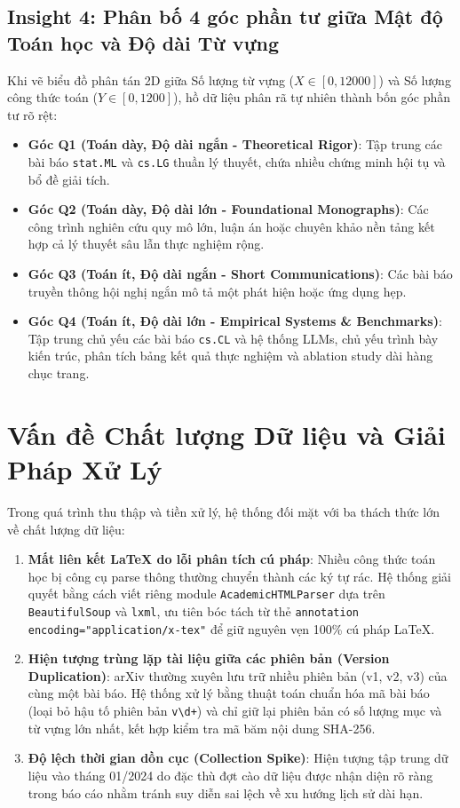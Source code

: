 \subsection{Insight 4: Phân bố 4 góc phần tư giữa Mật độ Toán học và Độ dài Từ vựng}
Khi vẽ biểu đồ phân tán 2D giữa Số lượng từ vựng ($X \in [0, 12000]$) và Số lượng công thức toán ($Y \in [0, 1200]$), hồ dữ liệu phân rã tự nhiên thành bốn góc phần tư rõ rệt:
\begin{itemize}
  \item \textbf{Góc Q1 (Toán dày, Độ dài ngắn - Theoretical Rigor)}: Tập trung các bài báo \texttt{stat.ML} và \texttt{cs.LG} thuần lý thuyết, chứa nhiều chứng minh hội tụ và bổ đề giải tích.
  \item \textbf{Góc Q2 (Toán dày, Độ dài lớn - Foundational Monographs)}: Các công trình nghiên cứu quy mô lớn, luận án hoặc chuyên khảo nền tảng kết hợp cả lý thuyết sâu lẫn thực nghiệm rộng.
  \item \textbf{Góc Q3 (Toán ít, Độ dài ngắn - Short Communications)}: Các bài báo truyền thông hội nghị ngắn mô tả một phát hiện hoặc ứng dụng hẹp.
  \item \textbf{Góc Q4 (Toán ít, Độ dài lớn - Empirical Systems \& Benchmarks)}: Tập trung chủ yếu các bài báo \texttt{cs.CL} và hệ thống LLMs, chủ yếu trình bày kiến trúc, phân tích bảng kết quả thực nghiệm và ablation study dài hàng chục trang.
\end{itemize}

\section{Vấn đề Chất lượng Dữ liệu và Giải Pháp Xử Lý}

Trong quá trình thu thập và tiền xử lý, hệ thống đối mặt với ba thách thức lớn về chất lượng dữ liệu:
\begin{enumerate}[label=\textbf{\arabic*.}]
  \item \textbf{Mất liên kết LaTeX do lỗi phân tích cú pháp}: Nhiều công thức toán học bị công cụ parse thông thường chuyển thành các ký tự rác. Hệ thống giải quyết bằng cách viết riêng module \texttt{AcademicHTMLParser} dựa trên \texttt{BeautifulSoup} và \texttt{lxml}, ưu tiên bóc tách từ thẻ \texttt{annotation encoding="application/x-tex"} để giữ nguyên vẹn 100\% cú pháp LaTeX.
  \item \textbf{Hiện tượng trùng lặp tài liệu giữa các phiên bản (Version Duplication)}: arXiv thường xuyên lưu trữ nhiều phiên bản (v1, v2, v3) của cùng một bài báo. Hệ thống xử lý bằng thuật toán chuẩn hóa mã bài báo (loại bỏ hậu tố phiên bản \texttt{v\textbackslash d+}) và chỉ giữ lại phiên bản có số lượng mục và từ vựng lớn nhất, kết hợp kiểm tra mã băm nội dung SHA-256.
  \item \textbf{Độ lệch thời gian dồn cục (Collection Spike)}: Hiện tượng tập trung dữ liệu vào tháng 01/2024 do đặc thù đợt cào dữ liệu được nhận diện rõ ràng trong báo cáo nhằm tránh suy diễn sai lệch về xu hướng lịch sử dài hạn.
\end{enumerate}
